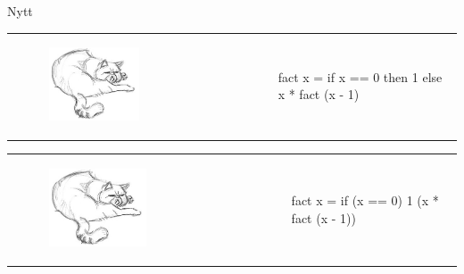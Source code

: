 \documentclass{beamer}
\newcommand{\sepFrame}[1] {
\begin{frame}
\begin{center}
	\Huge{#1}
\end{center}
\end{frame}
}
\begin{document}
\sepFrame{Nytt}

\begin{frame}[fragile]

\begin{tabular}{ m{5cm} m{9cm} }

\begin{figure}[H]
\centering
    \includegraphics[width=0.5\textwidth]{img/cat.jpg} 
\end{figure}

&

\begin{codeEx}
fact x = if  x == 0 
    then 1
    else x * fact (x - 1)
\end{codeEx}

\\
\end{tabular}

\end{frame}

\begin{frame}[fragile]

\begin{tabular}{ m{5cm} m{9cm} }

\begin{figure}[H]
\centering
    \includegraphics[width=0.5\textwidth]{img/cat.jpg} 
\end{figure}

&

\begin{codeEx}
fact x = if (x == 0) 
         1
        (x * fact (x - 1))
\end{codeEx}

\\
\end{tabular}

\end{frame}
\end{document}
